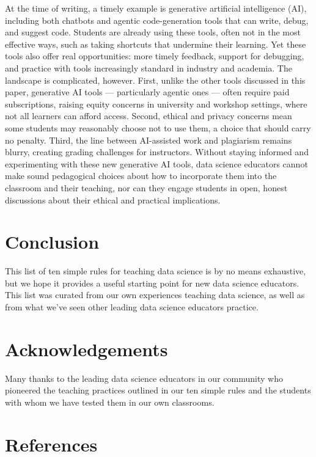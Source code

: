 \documentclass[
  10pt,
  letterpaper,
]{article}
\begin{document}
At the time of writing, a timely example is generative artificial
intelligence (AI), including both chatbots and agentic code-generation
tools that can write, debug, and suggest code. Students are already
using these tools, often not in the most effective ways, such as taking
shortcuts that undermine their learning. Yet these tools also offer real
opportunities: more timely feedback, support for debugging, and practice
with tools increasingly standard in industry and academia. The landscape
is complicated, however. First, unlike the other tools discussed in this
paper, generative AI tools --- particularly agentic ones --- often
require paid subscriptions, raising equity concerns in university and
workshop settings, where not all learners can afford access. Second,
ethical and privacy concerns mean some students may reasonably choose
not to use them, a choice that should carry no penalty. Third, the line
between AI-assisted work and plagiarism remains blurry, creating grading
challenges for instructors. Without staying informed and experimenting
with these new generative AI tools, data science educators cannot make
sound pedagogical choices about how to incorporate them into the
classroom and their teaching, nor can they engage students in open,
honest discussions about their ethical and practical implications.

\section{Conclusion}\label{sec-conclusion}

This list of ten simple rules for teaching data science is by no means
exhaustive, but we hope it provides a useful starting point for new data
science educators. This list was curated from our own experiences
teaching data science, as well as from what we've seen other leading
data science educators practice.

\section{Acknowledgements}\label{acknowledgements}

Many thanks to the leading data science educators in our community who
pioneered the teaching practices outlined in our ten simple rules and
the students with whom we have tested them in our own classrooms.

\section*{References}\label{references}
\end{document}
